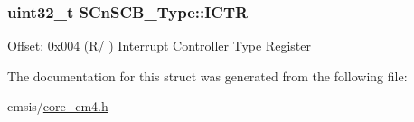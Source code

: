 \subsubsection[{\texorpdfstring{I\+C\+TR}{ICTR}}]{ uint32\+\_\+t S\+Cn\+S\+C\+B\+\_\+\+Type\+::\+I\+C\+TR}\hypertarget{struct_s_cn_s_c_b___type_ad99a25f5d4c163d9005ca607c24f6a98}{}\label{struct_s_cn_s_c_b___type_ad99a25f5d4c163d9005ca607c24f6a98}
Offset\+: 0x004 (R/ ) Interrupt Controller Type Register 

The documentation for this struct was generated from the following file\+:\begin{DoxyCompactItemize}
\item 
cmsis/\hyperlink{core__cm4_8h}{core\+\_\+cm4.\+h}\end{DoxyCompactItemize}
